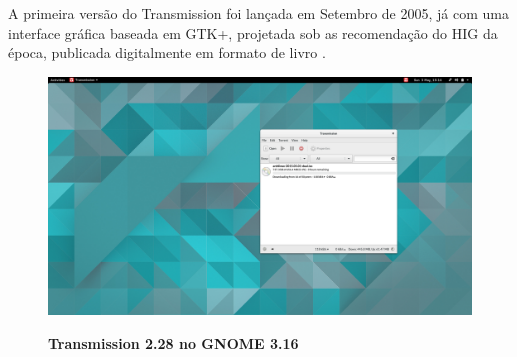 A primeira versão do Transmission foi lançada em Setembro de 2005, já com uma
interface gráfica baseada em GTK+, projetada sob as recomendação do HIG
da época, publicada digitalmente em formato de livro \cite{gnome221hig}.

\begin{figure}[htb]
  \begin{center}
    \caption{\textbf{Transmission 2.28 no GNOME 3.16}}
    \includegraphics [width=\textwidth]{image/transmission/282-master/main-window.png}
    \label{transmission-master}
  \end{center}
\end{figure}
